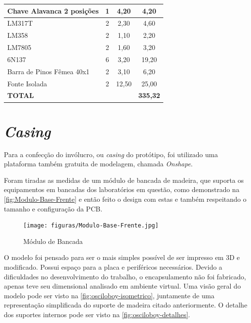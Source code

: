 \begin{table}[h!]
\begin{tabular}{|l|c|c|c|}
Chave Alavanca 2 posições & 1 & 4,20 & 4,20 \\ \hline
LM317T & 2 & 2,30 & 4,60 \\ \hline
LM358 & 2 & 1,10 & 2,20 \\ \hline
LM7805 & 2 & 1,60 & 3,20 \\ \hline
6N137 & 6 & 3,20 & 19,20 \\ \hline
Barra de Pinos Fêmea 40x1 & 2 & 3,10 & 6,20 \\ \hline
Fonte Isolada & 2 & 12,50 & 25,00 \\ \hline
\textbf{TOTAL} &  &  & \textbf{335,32} \\ \hline
\end{tabular}
\fonte{}
\end{table}


\section{\textit{Casing}}\label{Casing}

Para a confecção do invólucro, ou \textit{casing} do protótipo, foi utilizado uma plataforma também gratuita de modelagem, chamada \textit{Onshape}.

Foram tiradas as medidas de um módulo de bancada de madeira, que suporta os equipamentos em bancadas dos laboratórios em questão, como demonstrado na \autoref{fig:Modulo-Base-Frente} e então feito o design com estas e também respeitando o tamanho e configuração da \gls{PCB}.

\begin{figure}[htb!]
    \caption{Módulo de Bancada}
    \label{fig:Modulo-Base-Frente}
    \texttt{[image: figuras/Modulo-Base-Frente.jpg]}
    \fonte{}
\end{figure}

O modelo foi pensado para ser o mais simples possível de ser impresso em 3D e modificado. Possui espaço para a placa e periféricos necessários.
Devido a dificuldades no desenvolvimento do trabalho, o encapsulamento não foi fabricado, apenas teve seu dimensional analisado em ambiente virtual.
Uma visão geral do modelo pode ser visto na \autoref{fig:osciloboy-isometrico}, juntamente de uma representação simplificada do suporte de madeira citado anteriormente.
O detalhe dos suportes internos pode ser visto na \autoref{fig:osciloboy-detalhes}.

